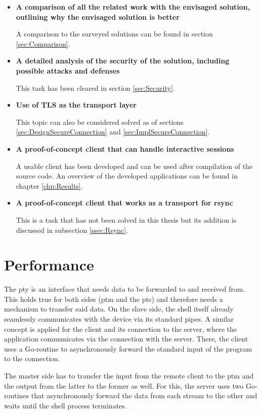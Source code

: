 \documentclass[10pt,a4paper,titlepage,twoside,english,final]{zhawreprt}
\begin{document}
\begin{itemize}
\item \textbf{A comparison of all the related work with the envisaged solution, outlining why the envisaged solution is better}

A comparison to the surveyed solutions can be found in section \ref{sec:Comparison}.

\item \textbf{A detailed analysis of the security of the solution, including
possible attacks and defenses}

This task has been cleared in section \ref{sec:Security}.

\item \textbf{Use of TLS as the transport layer}

This topic can also be considered solved as of sections \ref{sec:DesignSecureConnection} and \ref{sec:ImplSecureConnection}.

\item \textbf{A proof-of-concept client that can handle interactive sessions}

A usable client has been developed and can be used after compilation of the source code.
An overview of the developed applications can be found in chapter \ref{chp:Results}.

\item \textbf{A proof-of-concept client that works as a transport for rsync}

This is a task that has not been solved in this thesis but its addition is discussed in subsection \ref{ssec:Rsync}.
\end{itemize}



\section{Performance}\label{sec:Performance}
The \gls{pty} is an interface that needs data to be forwarded to and received from.
This holds true for both sides (\gls{ptm} and the \gls{pts}) and therefore needs a mechanism to transfer said data.
On the slave side, the \gls{shell} itself already seamlessly communicates with the device via its standard pipes.
A similar concept is applied for the client and its connection to the server, where the application communicates via the connection with the server.
There, the client uses a \gls{Go}-routine to asynchronously forward the standard input of the program to the connection.

The master side has to transfer the input from the remote client to the \gls{ptm} and the output from the latter to the former as well.
For this, the server uses two \gls{Go}-routines that asynchronously forward the data from each stream to the other and waits until the shell process terminates.
\end{document}
